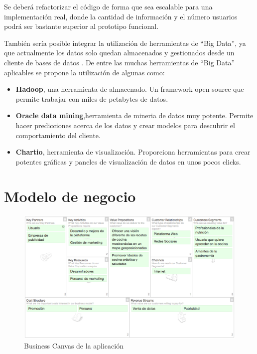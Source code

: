 Se deberá refactorizar el código de forma que sea escalable para una implementación real, donde la cantidad de información y el número usuarios podrá ser bastante superior al prototipo funcional.

\vspace{5 mm}

También sería posible integrar la utilización de herramientas de ``Big Data'', ya que actualmente los datos solo quedan almacenados y gestionados desde un cliente de bases de datos \cite{big-data-tools}. De entre las  muchas herramientas de ``Big Data'' aplicables se propone la utilización de algunas como:


\begin{itemize}
  \item \textbf{Hadoop}, una herramienta de almacenado. Un framework open-source que permite trabajar con miles de petabytes de datos.
  \item \textbf{Oracle data mining},herramienta de mineria de datos muy potente. Permite hacer predicciones acerca de los datos y crear modelos para descubrir el comportamiento del cliente.
  \item \textbf{Chartio}, herramienta de visualización. Proporciona herramientas para crear potentes gráficas y paneles de visualización de datos en
  unos pocos clicks.
\end{itemize}

\section{Modelo de negocio}

\begin{figure}
\begin{center}
\includegraphics[width=1.0\textwidth]{imagenes/business-canvas.png}
\caption{Business Canvas de la aplicación}
\label{business-canvas}
\end{center}
\end{figure}

